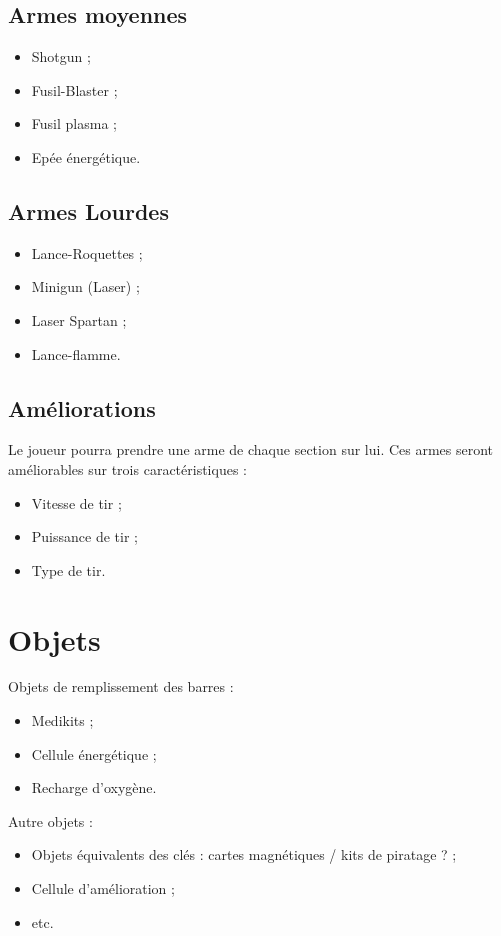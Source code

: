\documentclass[a4paper,12pt]{article}
\begin{document}
\subsection{Armes moyennes}
\begin{itemize}
  \item Shotgun ;
  \item Fusil-Blaster ;
  \item Fusil plasma ;
  \item Epée énergétique.
\end{itemize}

\subsection{Armes Lourdes}
\begin{itemize}
  \item Lance-Roquettes ;
  \item Minigun (Laser) ;
  \item Laser Spartan ;
  \item Lance-flamme.
\end{itemize}

\subsection{Améliorations}
Le joueur pourra prendre une arme de chaque section sur lui. Ces armes seront améliorables sur 
trois caractéristiques :
\begin{itemize}
  \item Vitesse de tir ;
  \item Puissance de tir ;
  \item Type de tir.
\end{itemize}

\section{Objets}

Objets de remplissement des barres :
\begin{itemize}
  \item Medikits ;
  \item Cellule énergétique ;
  \item Recharge d'oxygène.
\end{itemize}

Autre objets :
\begin{itemize}
  \item Objets équivalents des clés : cartes magnétiques / kits de piratage ? ;
  \item Cellule d'amélioration ;
  \item etc.
\end{itemize}
\end{document}
